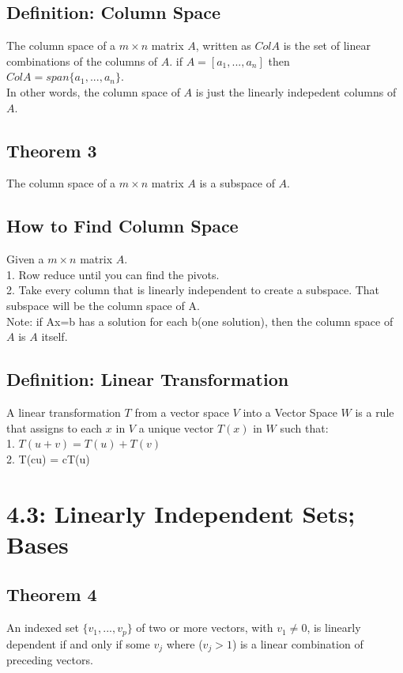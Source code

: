 \documentclass{article}
\begin{document}
    \subsection*{Definition: Column Space}
    The column space of a $m \times n$ matrix $A$, written as $Col A $ is the set of linear combinations of the columns of $A$. if $A=[a_1,...,a_n]$ then $Col A = span\{a_1,...,a_n\}$.\\
    In other words, the column space of $A$ is just the linearly indepedent columns of $A$.
    \subsection*{Theorem 3}
    The column space of a $m \times n$ matrix $A$ is a subspace of $A$.
    \subsection*{How to Find Column Space}
    Given a $m \times n$ matrix $A$.\\
    1. Row reduce until you can find the pivots.\\
    2. Take every column that is linearly independent to create a subspace. That subspace will be the column space of A.\\
    Note: if Ax=b has a solution for each b(one solution), then the column space of $A$ is $A$ itself.
    \subsection*{Definition: Linear Transformation}
    A linear transformation $T$ from a vector space $V$ into a Vector Space $W$ is a rule that assigns to each  $x$ in $V$ a unique vector $T(x)$ in  $W$ such that:\\
    1. $T(u+v) = T(u)+T(v)$\\
    2. T(cu) = cT(u)\\
    

    \section*{4.3: Linearly Independent Sets; Bases}

    \subsection*{Theorem 4}
    An indexed set $\{v_1,...,v_p\}$ of two or more vectors, with $v_1 \neq 0 $, is linearly 
    dependent if and only if some $v_j$ where ($v_j>1$) is a linear combination of preceding vectors.
    
\end{document}
